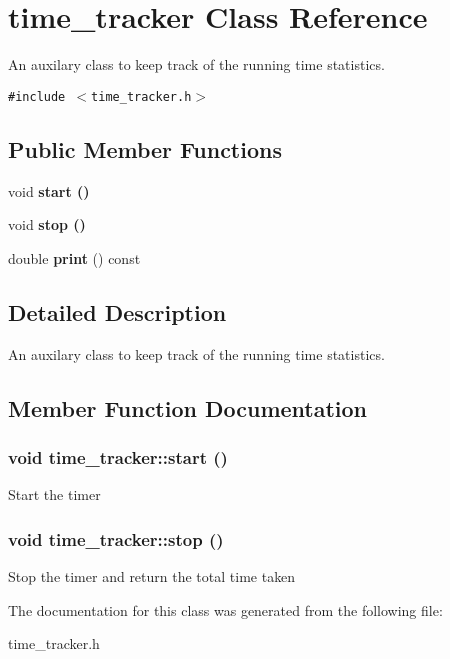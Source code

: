 \section{time\_\-tracker Class Reference}
\label{classtime__tracker}
An auxilary class to keep track of the running time statistics.  


{\tt \#include $<$time\_\-tracker.h$>$}

\subsection*{Public Member Functions}
\begin{CompactItemize}
\item 
void \bf{start} ()
\item 
void \bf{stop} ()
\item 
double \textbf{print} () const \label{classtime__tracker_f8aef1ae334f54b2e2bb226a24f5db62}

\end{CompactItemize}


\subsection{Detailed Description}
An auxilary class to keep track of the running time statistics. 



\subsection{Member Function Documentation}
\subsubsection{\setlength{\rightskip}{0pt plus 5cm}void time\_\-tracker::start ()\hspace{0.3cm}{\tt  [inline]}}\label{classtime__tracker_cbe4e1e72cf61ff3f4c135e161fc5a50}


Start the timer 
\subsubsection{\setlength{\rightskip}{0pt plus 5cm}void time\_\-tracker::stop ()\hspace{0.3cm}{\tt  [inline]}}\label{classtime__tracker_a6790d26a9c1c83569711a7634413856}


Stop the timer and return the total time taken 

The documentation for this class was generated from the following file:\begin{CompactItemize}
\item 
time\_\-tracker.h\end{CompactItemize}
